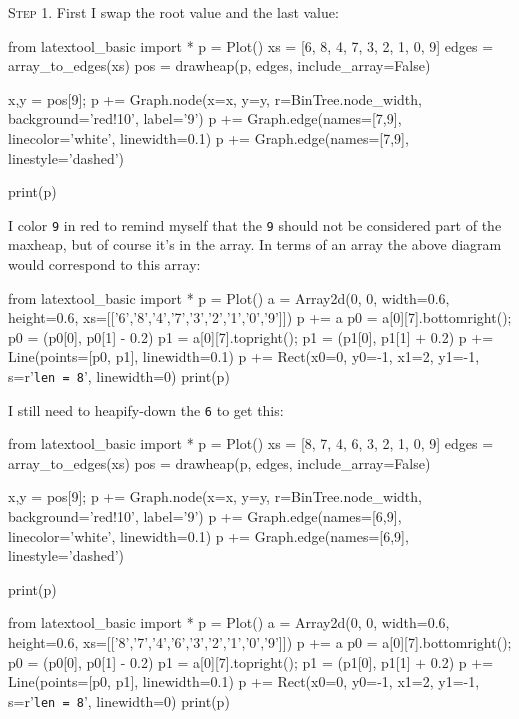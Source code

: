 \textsc{Step 1}.
First I swap the root value and the last value:

\begin{python}
from latextool_basic import *
p = Plot()
xs = [6, 8, 4, 7, 3, 2, 1, 0, 9]
edges = array_to_edges(xs)
pos = drawheap(p, edges, include_array=False)

x,y = pos[9]; p += Graph.node(x=x, y=y, r=BinTree.node_width, background='red!10', label='9')
p += Graph.edge(names=[7,9], linecolor='white', linewidth=0.1)
p += Graph.edge(names=[7,9], linestyle='dashed')

print(p)
\end{python}

I color \texttt{9} in red to remind myself
that the \texttt{9} should not be considered part of the maxheap,
but of course it's in the array.
In terms of an array the above diagram would correspond to this array:

\begin{python}
from latextool_basic import *
p = Plot()
a = Array2d(0, 0, width=0.6, height=0.6, 
             xs=[['6','8','4','7','3','2','1','0','9']])
p += a
p0 = a[0][7].bottomright(); p0 = (p0[0], p0[1] - 0.2)
p1 = a[0][7].topright(); p1 = (p1[0], p1[1] + 0.2)
p += Line(points=[p0, p1], linewidth=0.1)
p += Rect(x0=0, y0=-1, x1=2, y1=-1, s=r'\texttt{len = 8}', linewidth=0) 
print(p)
\end{python}

I still need to heapify-down the \texttt{6} to get this:

\begin{python}
from latextool_basic import *
p = Plot()
xs = [8, 7, 4, 6, 3, 2, 1, 0, 9]
edges = array_to_edges(xs)
pos = drawheap(p, edges, include_array=False)

x,y = pos[9]; p += Graph.node(x=x, y=y, r=BinTree.node_width, background='red!10', label='9')
p += Graph.edge(names=[6,9], linecolor='white', linewidth=0.1)
p += Graph.edge(names=[6,9], linestyle='dashed')

print(p)
\end{python}
\begin{python}
from latextool_basic import *
p = Plot()
a = Array2d(0, 0, width=0.6, height=0.6, 
             xs=[['8','7','4','6','3','2','1','0','9']])
p += a
p0 = a[0][7].bottomright(); p0 = (p0[0], p0[1] - 0.2)
p1 = a[0][7].topright(); p1 = (p1[0], p1[1] + 0.2)
p += Line(points=[p0, p1], linewidth=0.1)
p += Rect(x0=0, y0=-1, x1=2, y1=-1, s=r'\texttt{len = 8}', linewidth=0) 
print(p)
\end{python}

